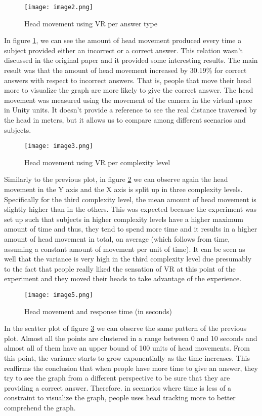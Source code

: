 \begin{figure}[!ht]
\centering
\texttt{[image: image2.png]}
\caption{Head movement using VR per answer type} \label{fig:plot2}
\end{figure}

In figure \ref{fig:plot2}, we can see the amount of head movement produced every time
a subject provided either an incorrect or a correct answer. This
relation wasn't discussed in the original paper and it provided some
interesting results. The main result was that the amount of head
movement increased by 30.19\% for correct answers with respect to
incorrect answers. That is, people that move their head more to
visualize the graph are more likely to give the correct answer. The head
movement was measured using the movement of the camera in the virtual
space in Unity units. It doesn't provide a reference to see the
real distance traversed by the head in meters, but it allows us to
compare among different scenarios and subjects.

\begin{figure}[!ht]
\centering
\texttt{[image: image3.png]}
\caption{Head movement using VR per complexity level} \label{fig:plot3}
\end{figure}

Similarly to the previous plot, in figure \ref{fig:plot3}  we can observe again the head movement in the
Y axis and the X axis is split up in three complexity levels. Specifically
for the third complexity level, the mean amount of head movement is
slightly higher than in the others. This was expected because the
experiment was set up such that subjects in higher complexity levels have
a higher maximum amount of time and thus, they tend to spend more time
and it results in a higher amount of head movement in total, on average (which follows from time, assuming a constant amount of movement per unit of time). It can be
seen as well that the variance is very high in the third complexity level
due presumably to the fact that people really liked the sensation of VR at
this point of the experiment and they moved their heads to take
advantage of the experience.

\begin{figure}[!ht]
\centering
\texttt{[image: image5.png]}
\caption{Head movement and response time (in seconds)} \label{fig:plot5}
\end{figure}

In the scatter plot of figure \ref{fig:plot5} we can observe the same pattern of the previous
plot. Almost all the points are clustered in a range between 0 and 10
seconds and almost all of them have an upper bound of 100 units of head
movements. From this point, the variance starts to grow exponentially as
the time increases. This reaffirms the conclusion that when
people have more time to give an answer, they try to see the graph from
a different perspective to be sure that they are providing a correct
answer. Therefore. in scenarios where time is less of a constraint to
visualize the graph, people uses head tracking more to better comprehend
the graph.

